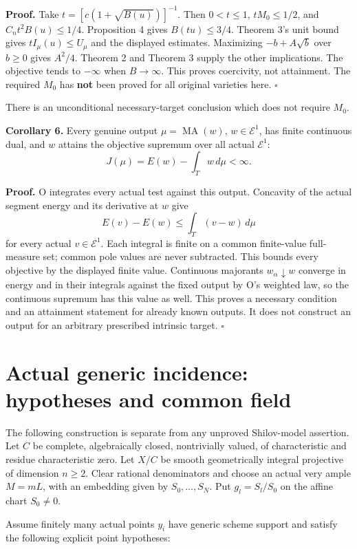 \documentclass[
  11pt,
]{article}
\begin{document}
\textbf{Proof.} Take \(t=[c(1+\sqrt{B(u)})]^{-1}\). Then \(0<t\leq1\),
\(tM_0\leq1/2\), and \(C_nt^2B(u)\leq1/4\). Proposition 4 gives
\(B(tu)\leq3/4\). Theorem 3's unit bound gives \(tI_\mu(u)\leq U_\mu\)
and the displayed estimates. Maximizing \(-b+A\sqrt b\) over \(b\geq0\)
gives \(A^2/4\). Theorem 2 and Theorem 3 supply the other implications.
The objective tends to \(-\infty\) when \(B\to\infty\). This proves
coercivity, not attainment. The required \(M_0\) has \textbf{not} been
proved for all original varieties here. \(\square\)

There is an unconditional necessary-target conclusion which does not
require \(M_0\).

\textbf{Corollary 6.} Every genuine output \(\mu=\operatorname{MA}(w)\),
\(w\in\mathcal E^1\), has finite continuous dual, and \(w\) attains the
objective supremum over all actual \(\mathcal E^1\): \[
 J(\mu)=E(w)-\int_Tw\,d\mu<\infty.
\]

\textbf{Proof.} O integrates every actual test against this output.
Concavity of the actual segment energy and its derivative at \(w\) give
\[
 E(v)-E(w)\leq\int_T(v-w)\,d\mu
\] for every actual \(v\in\mathcal E^1\). Each integral is finite on a
common finite-value full-measure set; common pole values are never
subtracted. This bounds every objective by the displayed finite value.
Continuous majorants \(w_\alpha\downarrow w\) converge in energy and in
their integrals against the fixed output by O's weighted law, so the
continuous supremum has this value as well. This proves a necessary
condition and an attainment statement for already known outputs. It does
not construct an output for an arbitrary prescribed intrinsic target.
\(\square\)

\section{Actual generic incidence: hypotheses and common
field}\label{actual-generic-incidence-hypotheses-and-common-field}

The following construction is separate from any unproved Shilov-model
assertion. Let \(C\) be complete, algebraically closed, nontrivially
valued, of characteristic and residue characteristic zero. Let \(X/C\)
be smooth geometrically integral projective of dimension \(n\geq2\).
Clear rational denominators and choose an actual very ample \(M=mL\),
with an embedding given by \(S_0,\ldots,S_N\). Put \(g_l=S_l/S_0\) on
the affine chart \(S_0\ne0\).

Assume finitely many actual points \(y_i\) have generic scheme support
and satisfy the following explicit point hypotheses:
\end{document}
